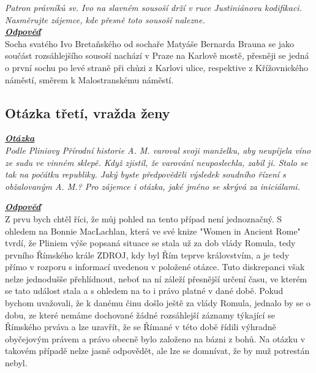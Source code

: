 \documentclass{article}
\begin{document}
\indent\textit{Patron právníků sv. Ivo na slavném sousoší drží v ruce Justiniánovu kodifikaci. Nasměrujte zájemce, kde přesně toto sousoší nalezne.}\\

\noindent\noindent\textbf{\textit{\underline{Odpověď}}}\\

\indent Socha svatého Ivo Bretaňského od sochaře Matyáše Bernarda Brauna se jako součást rozsáhlejšího sousoší nachází v Praze na Karlově mostě, přesněji se jedná o první sochu po levé straně při chůzi z Karlovi ulice, respektive z Křížovnického náměstí, směrem k Malostranskému náměstí.

\subsection{Otázka třetí, vražda ženy}
\textbf{\textit{\underline{Otázka}}}\\

\textit{Podle Pliniovy Přírodní historie A. M. varoval svoji manželku, aby neupíjela víno ze sudu ve vinném sklepě. Když zjistil, že varování neuposlechla, zabil ji. Stalo se tak na počátku republiky. Jaký byste předpověděli výsledek soudního řízení s obžalovaným A. M.? Pro zájemce i otázka, jaké jméno se skrývá za iniciálami.}\\

\newpage

\noindent\noindent\textbf{\textit{\underline{Odpověď}}}\\

Z prvu bych chtěl říci, že můj pohled na tento případ není jednoznačný. S ohledem na Bonnie MacLachlan, která ve své knize "Women in Ancient Rome" tvrdí, že Pliniem výše popsaná situace se stala už za dob vlády Romula, tedy prvního Římského krále ZDROJ, kdy byl Řím teprve královstvím, a je tedy přímo v rozporu s informací uvedenou v položené otázce. Tuto diskrepanci však nelze jednodušše přehlídnout, neboť na ní záleží přesnější určení času, ve kterém se tato událost stala a s ohledem na to i právo platné v dané době. Pokud bychom uvažovali, že k danému činu došlo ještě za vlády Romula, jednalo by se o dobu, ze které nemáme dochované žádné rozsáhlejší záznamy týkající se Římského prváva a lze uzavřít, že se Římané v této době řídili výhradně obyčejovým právem a právo obecně bylo založeno na bázni z bohů. Na otázku v takovém případě nelze jasně odpovědět, ale lze se domnívat, že by muž potrestán nebyl.\\
\end{document}
